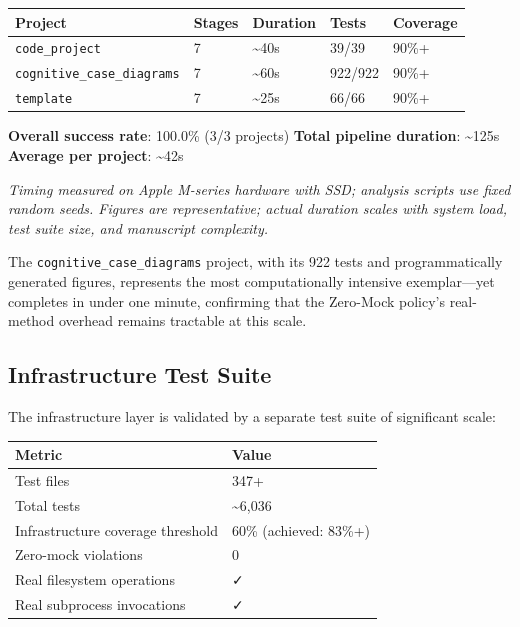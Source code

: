 \documentclass[
]{article}
\newcounter{none} %
\begin{document}
{\def\LTcaptype{none} %
\begin{longtable}[]{@{}lllll@{}}
\toprule\noalign{}
Project & Stages & Duration & Tests & Coverage \\
\midrule\noalign{}
\endhead
\bottomrule\noalign{}
\endlastfoot
\texttt{code\_project} & 7 & \textasciitilde40s & 39/39 & 90\%+ \\
\texttt{cognitive\_case\_diagrams} & 7 & \textasciitilde60s & 922/922 &
90\%+ \\
\texttt{template} & 7 & \textasciitilde25s & 66/66 & 90\%+ \\
\end{longtable}
}

\textbf{Overall success rate}: 100.0\% (3/3 projects) \textbf{Total
pipeline duration}: \textasciitilde125s \textbf{Average per project}:
\textasciitilde42s

\emph{Timing measured on Apple M-series hardware with SSD; analysis
scripts use fixed random seeds. Figures are representative; actual
duration scales with system load, test suite size, and manuscript
complexity.}

The \texttt{cognitive\_case\_diagrams} project, with its 922 tests and
programmatically generated figures, represents the most computationally
intensive exemplar---yet completes in under one minute, confirming that
the Zero-Mock policy's real-method overhead remains tractable at this
scale.

\subsection{Infrastructure Test Suite}\label{infrastructure-test-suite}

The infrastructure layer is validated by a separate test suite of
significant scale:

{\def\LTcaptype{none} %
\begin{longtable}[]{@{}ll@{}}
\toprule\noalign{}
Metric & Value \\
\midrule\noalign{}
\endhead
\bottomrule\noalign{}
\endlastfoot
Test files & 347+ \\
Total tests & \textasciitilde6,036 \\
Infrastructure coverage threshold & 60\% (achieved: 83\%+) \\
Zero-mock violations & 0 \\
Real filesystem operations & ✓ \\
Real subprocess invocations & ✓ \\
\end{longtable}
}
\end{document}
